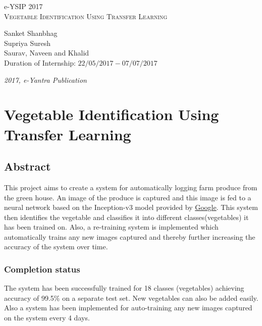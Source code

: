 \documentclass[a4paper,12pt,oneside]{book}
\begin{document}
\begin{titlepage}
\raggedright
{\Large e-YSIP 2017\\[1cm]}
{\Huge\scshape Vegetable Identification Using Transfer Learning \\[.1in]}
\vfill
\begin{flushright}
{\large Sanket Shanbhag \\}
{\large Supriya Suresh \\}
{\large Saurav, Naveen and Khalid \\}
{\large Duration of Internship: $ 22/05/2017-07/07/2017 $ \\}
\end{flushright}

{\itshape 2017, e-Yantra Publication}
\end{titlepage}

\chapter[Project Tag]{Vegetable Identification Using \\ Transfer Learning}
\section*{Abstract}
This project aims to create a system for automatically logging farm produce from the green house. An image of the produce is captured and this image is fed to a neural network based on the Inception-v3 model provided by \href{https://research.googleblog.com/2016/03/train-your-own-image-classifier-with.html}{Google}. This system then identifies the vegetable and classifies it into different classes(vegetables) it has been trained on. Also, a re-training system is implemented which automatically trains any new images captured and thereby further increasing the accuracy of the system over time.

\subsection*{Completion status}
The system has been successfully trained for 18 classes (vegetables) achieving accuracy of 99.5\% on a separate test set. New vegetables can also be added easily. Also a system has been implemented for auto-training any new images captured on the system every 4 days.
\end{document}
